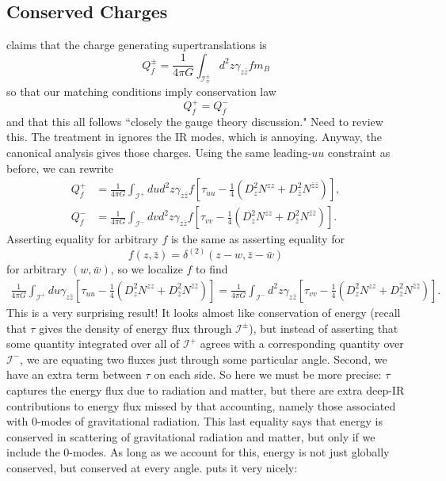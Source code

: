 \documentclass[11pt,letterpaper]{article}
\newcommand{\LP}{\left(}
\newcommand{\RP}{\right)}
\newcommand{\mc}[1]{\mathcal{#1}}
\begin{document}
\subsection{Conserved Charges}
\cite{Strominger:2017zoo} claims that the charge generating supertranslations is \begin{equation}
Q_f^\pm = \frac{1}{4 \pi G} \int_{\mc{I}^\pm_\mp} d^2 z \gamma_{z \bar{z}} f m_B
\end{equation}
so that our matching conditions imply conservation law \begin{equation}
Q_f^+ = Q_f^-
\end{equation}
and that this all follows ``closely the gauge theory discussion." Need to review this. The treatment in \cite{Strominger:2013jfa} ignores the IR modes, which is annoying. Anyway, the canonical analysis gives those charges. Using the same leading-$uu$ constraint as before, we can rewrite \begin{equation}
\begin{aligned}
Q_f^+ & = \frac{1}{4 \pi G} \int_{\mc{I}^+} du d^2 z \gamma_{z \bar{z}} f \left[ \tau_{uu} - \frac{1}{4} \LP D_z^2 N^{zz} + D_{\bar{z}}^2 N^{\bar{z} \bar{z}} \RP \right], \\
Q_f^- & = \frac{1}{4 \pi G} \int_{\mc{I}^-} dv d^2 z \gamma_{z \bar{z}} f \left[ \tau_{vv} - \frac{1}{4} \LP D_z^2 N^{zz} + D_{\bar{z}}^2 N^{\bar{z} \bar{z}} \RP \right].
\end{aligned}
\end{equation}
Asserting equality for arbitrary $f$ is the same as asserting equality for \begin{equation}
f(z, \bar{z}) = \delta^{(2)}(z - w, \bar{z} - \bar{w})
\end{equation}
for arbitrary $(w, \bar{w})$, so we localize $f$ to find \begin{equation}
\begin{aligned}
\frac{1}{4 \pi G} \int_{\mc{I}^+} du \gamma_{z \bar{z}} \left[ \tau_{uu} - \frac{1}{4} \LP D_z^2 N^{zz} + D_{\bar{z}}^2 N^{\bar{z} \bar{z}} \RP \right] = \frac{1}{4 \pi G} \int_{\mc{I}^-} d^2 z \gamma_{z \bar{z}} \left[ \tau_{vv} - \frac{1}{4} \LP D_z^2 N^{zz} + D_{\bar{z}}^2 N^{\bar{z} \bar{z}} \RP \right].
\end{aligned}
\end{equation}
This is a very surprising result! It looks almost like conservation of energy (recall that $\tau$ gives the density of energy flux through $\mc{I}^\pm$), but instead of asserting that some quantity integrated over all of $\mc{I}^+$ agrees with a corresponding quantity over $\mc{I}^-$, we are equating two fluxes just through some particular angle. Second, we have an extra term between $\tau$ on each side. So here we must be more precise: $\tau$ captures the energy flux due to radiation and matter, but there are extra deep-IR contributions to energy flux missed by that accounting, namely those associated with 0-modes of gravitational radiation. This last equality says that energy is conserved in scattering of gravitational radiation and matter, but only if we include the 0-modes. As long as we account for this, energy is not just globally conserved, but conserved at every angle. \cite{Strominger:2013jfa} puts it very nicely: \\
\end{document}
